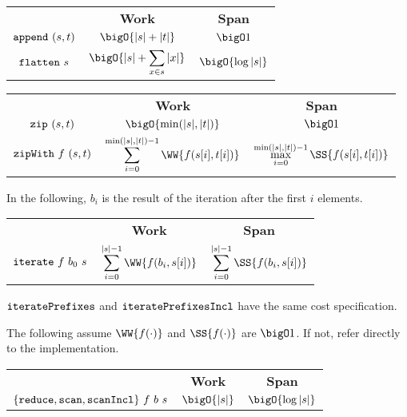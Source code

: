 \begin{costspec}[Concatenation]
\begin{tabular}{c|c|c}
& \textbf{Work} & \textbf{Span} \\
%
$\texttt{append}~(s,t)$ &
$\displaystyle \bigO{|s| + |t|}$ &
$\displaystyle \bigO 1$ \\
%
$\texttt{flatten}~s$ &
$\displaystyle \bigO{|s| + \sum_{x \in s} |x|}$ &
$\displaystyle \bigO{\log{|s|}}$
%
\end{tabular}
\end{costspec}

\begin{costspec}[Zip]
\begin{tabular}{c|c|c}
& \textbf{Work} & \textbf{Span} \\
%
$\texttt{zip}~(s,t)$ &
$\displaystyle \bigO{\min(|s|,|t|)}$ &
$\displaystyle \bigO 1$ \\
%
$\texttt{zipWith}~f~(s,t)$ &
$\displaystyle \sum_{i = 0}^{\min(|s|,|t|)-1} \WW{f(s[i],t[i])}$ &
$\displaystyle \max_{i = 0}^{\min(|s|,|t|)-1} \SS{f(s[i],t[i])}$
%
\end{tabular}
\end{costspec}

\begin{flex}
\begin{costspec}[Iteration]
In the following, $b_i$ is the result of the iteration after the first $i$
elements.
\begin{tabular}{c|c|c}
& \textbf{Work} & \textbf{Span} \\
%
$\texttt{iterate}~f~b_0~s$ &
$\displaystyle \sum_{i = 0}^{|s|-1} \WW{f(b_i, s[i])}$ &
$\displaystyle \sum_{i = 0}^{|s|-1} \SS{f(b_i, s[i])}$
\end{tabular}
\end{costspec}
\begin{note}
$\texttt{iteratePrefixes}$ and $\texttt{iteratePrefixesIncl}$ have the same cost
specification.
\end{note}
\end{flex}

\begin{costspec}
The following assume $\WW{f(\cdot)}$ and $\SS{f(\cdot)}$ are $\bigO 1$. If not,
refer directly to the implementation.
\begin{tabular}{c|c|c}
& \textbf{Work} & \textbf{Span} \\
%
$\{\texttt{reduce},\texttt{scan},\texttt{scanIncl}\}~f~b~s$ &
$\displaystyle \bigO{|s|}$ &
$\displaystyle \bigO{\log{|s|}}$
%
\end{tabular}
\end{costspec}

